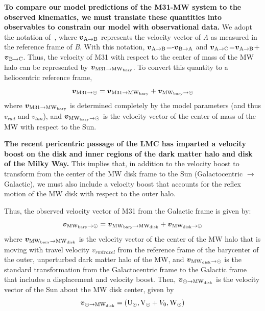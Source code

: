 \documentclass[twocolumn]{aastex631}
\newcommand{\bov}{\boldsymbol{v}}
\newcommand{\vel}[2]{\bov_{\rm #1 \to #2}}
\newcommand{\mwbary}{\rm MW_{bary}}
\newcommand{\mwdisk}{\rm MW_{disk}}
\begin{document}
\textbf{To compare our model predictions of the M31-MW system to the observed kinematics, we must translate these quantities into observables to constrain our model with observational data.}
We adopt the notation of~\cite{Penarrubia2016}, where $\vel{A}{B}$ represents the velocity vector of \textit{A} as measured in the reference frame of \textit{B}. With this notation, $\vel{A}{B}$=-$\vel{B}{A}$ and $\vel{A}{C}$=$\vel{A}{B}$+$\vel{B}{C}$. Thus, the velocity of M31 with respect to the center of mass of the MW halo can be represented by $\vel{M31}{\mwbary}$. To convert this quantity to a heliocentric reference frame, 
\begin{equation}  
  \vel{M31}{\odot} = \vel{M31}{\mwbary}+\vel{\mwbary}{\odot}
\end{equation}
where $\vel{M31}{\mwbary}$ is determined completely by the model parameters (and thus $v_{rad}$ and $v_{tan}$), and 
$\vel{\mwbary}{\odot}$ is the velocity vector of the center of mass of the MW with respect to the Sun. 

\textbf{The recent pericentric passage of the LMC has imparted a velocity boost on the disk and inner regions of the dark matter halo and disk of the Milky Way.} This implies that, in addition to the velocity boost to transform from the center of the MW disk frame to the Sun (Galactocentric $\to$ Galactic), we must also include a velocity boost that accounts for the reflex motion of the MW disk with respect to the outer halo.

Thus, the observed velocity vector of M31 from the Galactic frame is given by:
\begin{equation}
  \vel{\mwbary}{\odot} = \vel{\mwbary}{\mwdisk} + \vel{\mwdisk}{\odot}
\end{equation}
where $\vel{\mwbary}{\mwdisk}$ is the velocity vector of the center of the MW halo that is moving with travel velocity $v_{rm travel}$ from the reference frame of the barycenter of the outer, unperturbed dark matter halo of the MW, and $\vel{\mwdisk}{\odot}$ is the standard transformation from the Galactocentric frame to the Galactic frame that includes a displacement and velocity boost.
Then, $\vel{\odot}{\mwdisk}$ is the velocity vector of the Sun about the MW disk center, given by 
\begin{equation}
  \vel{\odot}{\mwdisk}=({\rm U}_\odot, {\rm V}_\odot + V_0, {\rm W}_\odot)  
\end{equation}
\end{document}
